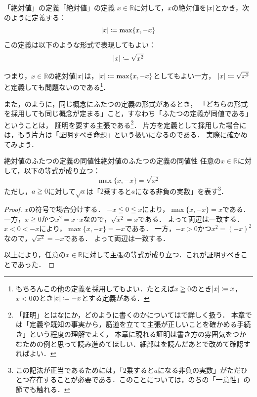 \begin{example}{「絶対値」の定義}{「絶対値」の定義}
  $ x \in \mathbb{R}$に対して，$x$の絶対値を$\lvert x\rvert$とかき，次のように定義する：
  \[
    \lvert x\rvert \coloneqq \max \{ x , -x \}
  \]
  この定義は以下のような形式で表現してもよい：
  \[
    \lvert x\rvert \coloneqq  \sqrt{x^2}
  \]
\end{example}

つまり，$x\in\mathbb{R}$の絶対値$\lvert x\rvert$は，$\lvert x\rvert \coloneqq \max \{ x, -x \}$としてもよい一方，
$\lvert x\rvert \coloneqq \sqrt{x^2}$と定義しても問題ないのである\footnote{もちろんこの他の定義を採用してもよい．たとえば$x\geqq 0$のとき$\lvert x\rvert \coloneqq x$，$x<0$のとき$\lvert x\rvert \coloneqq -x$とする定義がある．}．

また，のように，同じ概念にふたつの定義の形式があるとき，
「どちらの形式を採用しても同じ概念が定まる」こと，すなわち「ふたつの定義が同値である」ということは，
証明を要する主張である\footnote{「証明」とはなにか，どのように書くのかについてはで詳しく扱う．
本章では「定義や既知の事実から，筋道を立てて主張が正しいことを確かめる手続き」という程度の理解でよく，
本章に現れる証明は書き方の雰囲気をつかむための例と思って読み進めてほしい．細部はを読んだあとで改めて確認すればよい．}．
片方を定義として採用した場合には，もう片方は「証明すべき命題」という扱いになるのである．
実際に確かめてみよう．
 
\begin{prop}{絶対値のふたつの定義の同値性}{絶対値のふたつの定義の同値性}
  任意の$x \in \mathbb{R}$に対して，以下の等式が成り立つ：
  \[
    \max \{ x , -x \} = \sqrt{x^2}
  \]
  ただし，$a \geqq 0$に対して$\sqrt{a}$は「$2$乗すると$a$になる非負の実数」を表す\footnote{この記法が正当であるためには，「$2$乗すると$a$になる非負の実数」がただひとつ存在することが必要である．このことについては，のちの「一意性」の節でも触れる．}．
\end{prop}
 
\begin{leftbar}
  \begin{proof}
    $x$の符号で場合分けする．
            $-x \leqq 0 \leqq x$により，$\max \{ x,-x \} = x$である．
            一方，$x \geqq 0$かつ$x^2 = x \cdot x$なので，$\sqrt{x^2}=x$である．
            よって両辺は一致する．
            $x < 0 < -x$により，$\max \{ x,-x \} = -x$である．
            一方，$-x > 0$かつ$x^2 = (-x)^2$なので，$\sqrt{x^2}=-x$である．
            よって両辺は一致する．
            
            \smallskip
    以上により，任意の$x \in \mathbb{R}$に対して主張の等式が成り立つ．これが証明すべきことであった．
  \end{proof}
\end{leftbar}

